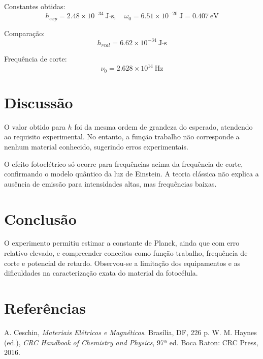 \documentclass[conference]{IEEEtran}
\begin{document}
Constantes obtidas:
\[
h_{exp} = 2.48 \times 10^{-34}\ \text{J·s}, \quad
\omega_0 = 6.51 \times 10^{-20}\ \text{J} = 0.407\ \text{eV}
\]

Comparação:
\[
h_{real} = 6.62 \times 10^{-34}\ \text{J·s}
\]

Frequência de corte:
\[
\nu_0 = 2.628 \times 10^{14}\ \text{Hz}
\]

\section{Discussão}
O valor obtido para $h$ foi da mesma ordem de grandeza do esperado, atendendo ao requisito experimental. No entanto, a função trabalho não corresponde a nenhum material conhecido, sugerindo erros experimentais.  

O efeito fotoelétrico só ocorre para frequências acima da frequência de corte, confirmando o modelo quântico da luz de Einstein. A teoria clássica não explica a ausência de emissão para intensidades altas, mas frequências baixas.

\section{Conclusão}
O experimento permitiu estimar a constante de Planck, ainda que com erro relativo elevado, e compreender conceitos como função trabalho, frequência de corte e potencial de retardo. Observou-se a limitação dos equipamentos e as dificuldades na caracterização exata do material da fotocélula.  

\section*{Referências}
\begin{thebibliography}{00}
 A. Ceschin, \textit{Materiais Elétricos e Magnéticos}. Brasília, DF, 226 p.
 W. M. Haynes (ed.), \textit{CRC Handbook of Chemistry and Physics}, 97ª ed. Boca Raton: CRC Press, 2016.
\end{thebibliography}
\end{document}
